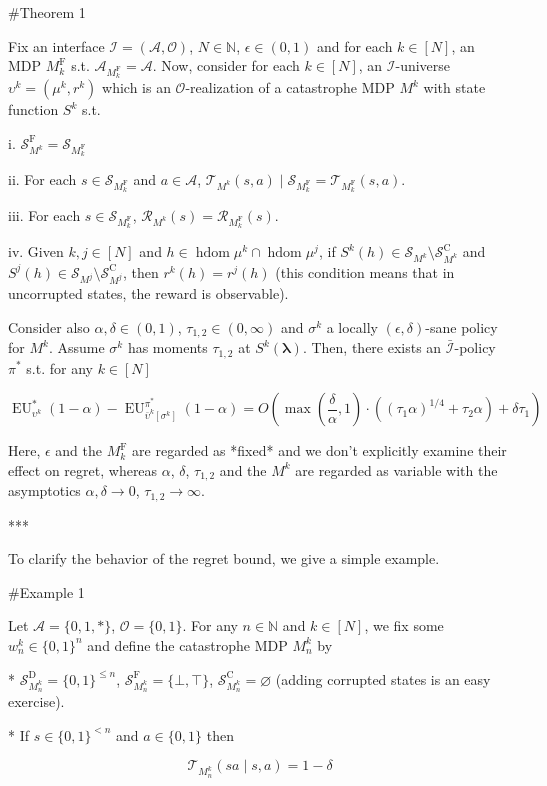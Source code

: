 \documentclass[a4paper]{article}
\newcommand{\Bool}{\{0,1\}}
\newcommand{\AP}[1]{\left(#1\right)}
\newcommand{\AB}[1]{\left[#1\right]}
\newcommand{\Nats}{\mathbb{N}}
\newcommand{\Estr}{\boldsymbol{\lambda}}
\newcommand{\Ob}{\mathcal{O}}
\newcommand{\A}{\mathcal{A}}
\newcommand{\St}{\mathcal{S}}
\newcommand{\T}{\mathcal{T}}
\newcommand{\R}{\mathcal{R}}
\newcommand{\In}{\mathcal{I}}
\newcommand{\Adi}{{\bar{\In}}}
\DeclareMathOperator{\HD}{hdom}
\newcommand{\RMC}{\mathrm{C}}
\newcommand{\RMD}{\mathrm{D}}
\newcommand{\RMF}{\mathrm{F}}
\newcommand{\SF}{\St^{\RMF}}
\newcommand{\SD}{\St^{\RMD}}
\newcommand{\SC}{\St^{\RMC}}
\newcommand{\MF}{M^{\RMF}}
\newcommand{\EU}{\operatorname{EU}}
\begin{document}
\#Theorem 1

Fix an interface $\In=(\A,\Ob)$, $N \in \Nats$, $\epsilon \in (0,1)$ and for each $k \in [N]$, an MDP $\MF_k$ s.t. $\A_{\MF_k} = \A$. Now, consider for each $k \in [N]$, an $\In$-universe $\upsilon^k=(\mu^k,r^k)$ which is an $\Ob$-realization of a catastrophe MDP $M^k$ with state function $S^k$ s.t.

i. $\SF_{M^k} = \St_{\MF_k}$

ii. For each $s \in \St_{\MF_k}$ and $a \in \A$, $\T_{M^k}(s,a) \mid \St_{\MF_k} = \T_{\MF_k}(s,a)$.

iii. For each $s \in \St_{\MF_k}$, $\R_{M^k}(s)=\R_{\MF_k}(s)$.

iv. Given $k,j \in [N]$ and $h \in \HD{\mu^k} \cap \HD{\mu^j}$, if $S^k(h) \in \St_{M^k} \setminus \SC_{M^k}$ and $S^j(h) \in \St_{M^j} \setminus \SC_{M^j}$, then $r^k(h)=r^j(h)$ (this condition means that in uncorrupted states, the reward is observable).

Consider also $\alpha,\delta\in(0,1)$, $\tau_{1,2} \in (0,\infty)$ and $\sigma^k$ a locally $(\epsilon,\delta)$-sane policy for $M^k$. Assume $\sigma^k$ has moments $\tau_{1,2}$ at $S^k(\Estr)$. Then, there exists an $\Adi$-policy $\pi^*$ s.t. for any $k \in [N]$

$$\EU_{\upsilon^k}^*(1-\alpha) - \EU_{\bar{\upsilon}^k\AB{\sigma^k}}^{\pi^*}(1-\alpha) = O\AP{\max\AP{\frac{\delta}{\alpha},1}\cdot\AP{(\tau_1 \alpha)^{1/4} + \tau_2 \alpha}+\delta\tau_1}$$

Here, $\epsilon$ and the $\MF_k$ are regarded as *fixed* and we don't explicitly examine their effect on regret, whereas $\alpha$, $\delta$, $\tau_{1,2}$ and the $M^k$ are regarded as variable with the asymptotics $\alpha,\delta \rightarrow 0$, $\tau_{1,2} \rightarrow \infty$.

***

To clarify the behavior of the regret bound, we give a simple example.

\#Example 1

Let $\A = \{0,1,*\}$, $\Ob=\Bool$. For any $n \in \Nats$ and $k \in [N]$, we fix some $w_n^k \in \Bool^n$ and define the catastrophe MDP $M_n^k$ by

* $\SD_{M_n^k} = \Bool^{\leq n}$, $\SF_{M_n^k} = \{\bot,\top\}$, $\SC_{M_n^k} = \varnothing$ (adding corrupted states is an easy exercise).

* If $s \in \Bool^{< n}$ and $a \in \Bool$ then 

$$\T_{M_n^k}(sa \mid s,a) = 1 - \delta$$
\end{document}
